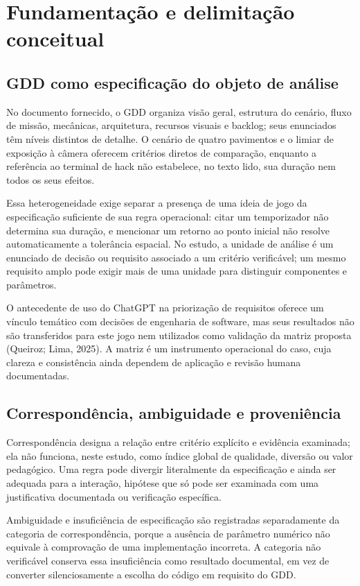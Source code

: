 \section{Fundamentação e delimitação conceitual}
\subsection{GDD como especificação do objeto de análise}
No documento fornecido, o GDD organiza visão geral, estrutura do cenário, fluxo de missão, mecânicas, arquitetura, recursos visuais e backlog; seus enunciados têm níveis distintos de detalhe. O cenário de quatro pavimentos e o limiar de exposição à câmera oferecem critérios diretos de comparação, enquanto a referência ao terminal de hack não estabelece, no texto lido, sua duração nem todos os seus efeitos.

Essa heterogeneidade exige separar a presença de uma ideia de jogo da especificação suficiente de sua regra operacional: citar um temporizador não determina sua duração, e mencionar um retorno ao ponto inicial não resolve automaticamente a tolerância espacial. No estudo, a unidade de análise é um enunciado de decisão ou requisito associado a um critério verificável; um mesmo requisito amplo pode exigir mais de uma unidade para distinguir componentes e parâmetros.

O antecedente de uso do ChatGPT na priorização de requisitos oferece um vínculo temático com decisões de engenharia de software, mas seus resultados não são transferidos para este jogo nem utilizados como validação da matriz proposta (Queiroz; Lima, 2025). A matriz é um instrumento operacional do caso, cuja clareza e consistência ainda dependem de aplicação e revisão humana documentadas.

\subsection{Correspondência, ambiguidade e proveniência}
Correspondência designa a relação entre critério explícito e evidência examinada; ela não funciona, neste estudo, como índice global de qualidade, diversão ou valor pedagógico. Uma regra pode divergir literalmente da especificação e ainda ser adequada para a interação, hipótese que só pode ser examinada com uma justificativa documentada ou verificação específica.

Ambiguidade e insuficiência de especificação são registradas separadamente da categoria de correspondência, porque a ausência de parâmetro numérico não equivale à comprovação de uma implementação incorreta. A categoria não verificável conserva essa insuficiência como resultado documental, em vez de converter silenciosamente a escolha do código em requisito do GDD.

